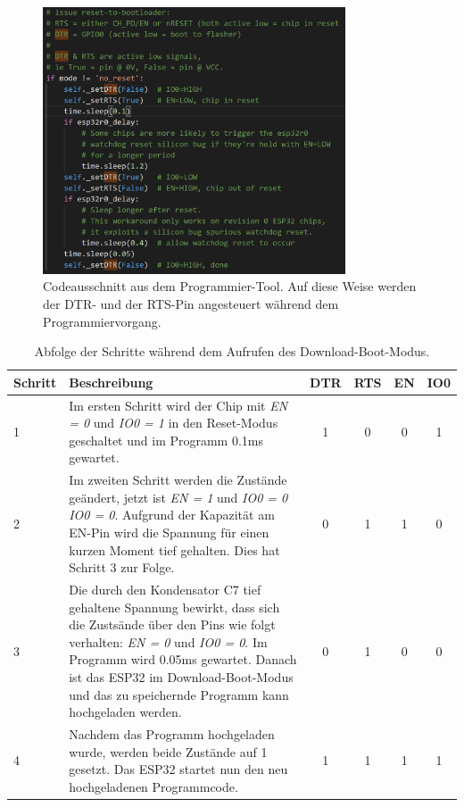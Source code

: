 \newpage
\begin{figure}[h!]
	\centering
	\includegraphics[width=0.8\textwidth]{graphics/ESP32_Boot_Code}
	\caption{Codeausschnitt aus dem Programmier-Tool. Auf diese Weise werden der DTR- und der RTS-Pin angesteuert während dem Programmiervorgang.}
	\label{fig:ESP32_Boot_Code}
\end{figure}

\begin{table}[h!]
\center
\begin{tabularx}{\textwidth}{|l|X||c|c||c|c|}
\hline
Schritt & Beschreibung & DTR & RTS & EN & IO0\\
\hline
1 & Im ersten Schritt wird der Chip mit \textit{EN = 0} und \textit{IO0 = 1} in den Reset-Modus geschaltet und im Programm 0.1ms gewartet. & 1 & 0 & 0 & 1 \\
\hline
2 & Im zweiten Schritt werden die Zustände geändert, jetzt ist \textit{EN = 1} und \textit{IO0 = 0} \textit{IO0 = 0}. Aufgrund der Kapazität am EN-Pin wird die Spannung für einen kurzen Moment tief gehalten. Dies hat Schritt 3 zur Folge. & 0 & 1 & 1 & 0 \\
\hline
3 & Die durch den Kondensator C7 tief gehaltene Spannung bewirkt, dass sich die Zustsände über den Pins wie folgt verhalten: \textit{EN = 0} und \textit{IO0 = 0}. Im Programm wird 0.05ms gewartet. Danach ist das ESP32 im Download-Boot-Modus und das zu speichernde Programm kann hochgeladen werden. & 0 & 1 & 0 & 0 \\
\hline
4 & Nachdem das Programm hochgeladen wurde, werden beide Zustände auf 1 gesetzt. Das ESP32 startet nun den neu hochgeladenen Programmcode. & 1 & 1 & 1 & 1 \\
\hline
\end{tabularx}
\caption{Abfolge der Schritte während dem Aufrufen des Download-Boot-Modus.}
\label{tab:Abfolge_Download_Boot_Modus}
\end{table}
